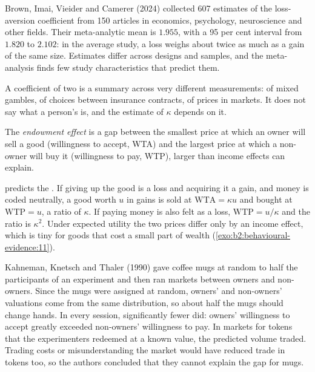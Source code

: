 \begin{record}
Brown, Imai, Vieider and Camerer (2024) collected 607 estimates of the loss-aversion coefficient from
150 articles in economics, psychology, neuroscience and other fields. Their meta-analytic mean is
$1.955$, with a 95 per cent interval from $1.820$ to $2.102$: in the average study, a loss weighs about
twice as much as a gain of the same size. Estimates differ across designs and samples, and the meta-
analysis finds few study characteristics that predict them.
\end{record}

A coefficient of two is a summary across very different measurements: of mixed gambles, of choices
between insurance contracts, of prices in markets. It does not say what a person's  is,
and the estimate of $\kappa$ depends on it.

\begin{definition}\label{def:b2:behavioural-evidence:endowment-effect}
The \emph{endowment effect} is a gap between the smallest price at which an
owner will sell a good (willingness to accept, WTA) and the largest price at which a non-owner will buy
it (willingness to pay, WTP), larger than income effects can explain.
\end{definition}

 predicts the . If giving up the good is a loss and acquiring it a gain,
and money is coded neutrally, a good worth $u$ in gains is sold at $\mathrm{WTA} = \kappa u$ and bought
at $\mathrm{WTP} = u$, a ratio of $\kappa$. If paying money is also felt as a loss, $\mathrm{WTP} =
u/\kappa$ and the ratio is $\kappa^2$. Under expected utility the two prices differ only by an income
effect, which is tiny for goods that cost a small part of wealth (\cref{exo:b2:behavioural-evidence:11}).

\begin{record}[Mugs]
Kahneman, Knetsch and Thaler (1990) gave coffee mugs at random to half the participants of an experiment
and then ran markets between owners and non-owners. Since the mugs were assigned at random, owners' and
non-owners' valuations come from the same distribution, so about half the mugs should change hands. In
every session, significantly fewer did: owners' willingness to accept greatly exceeded non-owners'
willingness to pay. In markets for tokens that the experimenters redeemed at a known value, the
predicted volume traded. Trading costs or misunderstanding the market would have reduced trade in tokens
too, so the authors concluded that they cannot explain the gap for mugs.
\end{record}

